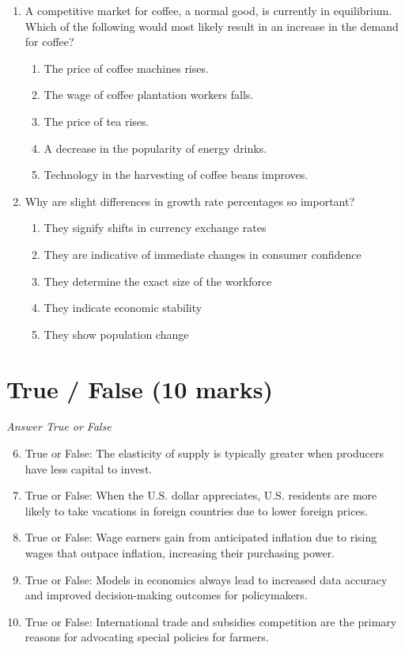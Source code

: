 \documentclass[12pt]{article}
\begin{document}
\begin{enumerate}[label=\arabic*.]
\begin{enumerate}[label=(\alph*)]
    \item Compare AVC to MR.
    \item Compare AFC to MR.
    \item Shut down if the firm is not making a profit.
\end{enumerate}
\item A competitive market for coffee, a normal good, is currently in equilibrium. Which of the following would most likely result in an increase in the demand for coffee?
\begin{enumerate}[label=(\alph*)]
    \item The price of coffee machines rises.
    \item The wage of coffee plantation workers falls.
    \item The price of tea rises.
    \item A decrease in the popularity of energy drinks.
    \item Technology in the harvesting of coffee beans improves.
\end{enumerate}
\item Why are slight differences in growth rate percentages so important?
\begin{enumerate}[label=(\alph*)]
    \item They signify shifts in currency exchange rates
    \item They are indicative of immediate changes in consumer confidence
    \item They determine the exact size of the workforce
    \item They indicate economic stability
    \item They show population change
\end{enumerate}
\end{enumerate}

\section*{True / False (10 marks)}
\textit{Answer True or False}
\begin{enumerate}[label=\arabic*.]
\setcounter{enumi}{5}
\item True or False: The elasticity of supply is typically greater when producers have less capital to invest.
\item True or False: When the U.S. dollar appreciates, U.S. residents are more likely to take vacations in foreign countries due to lower foreign prices.
\item True or False: Wage earners gain from anticipated inflation due to rising wages that outpace inflation, increasing their purchasing power.
\item True or False: Models in economics always lead to increased data accuracy and improved decision-making outcomes for policymakers.
\item True or False: International trade and subsidies competition are the primary reasons for advocating special policies for farmers.
\end{enumerate}
\end{document}
